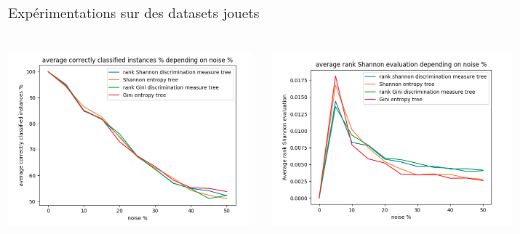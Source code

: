 \documentclass[usenames,dvipsnames]{beamer}
\begin{document}
\begin{frame}{Expérimentations sur des datasets jouets}
\begin{columns}
\begin{column}{0.45\textwidth}
            \centering
            \includegraphics[width=\textwidth]{acc_3.png}
        \end{column}
        \begin{column}{0.45\textwidth}
            \centering
            \includegraphics[width=\textwidth]{shannon_eval_3.png}
        \end{column}
    \end{columns}
\end{frame}
\end{document}

